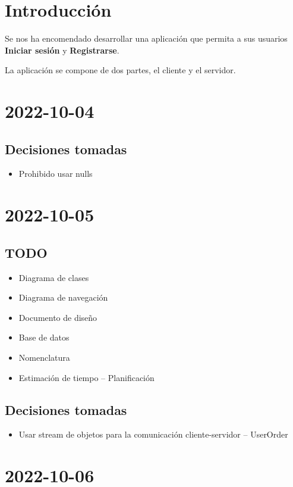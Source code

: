 \documentclass[a4paper]{article}
\begin{document}
	\newpage

	\section{Introducción}
		Se nos ha encomendado desarrollar una aplicación que permita a
		sus usuarios \textbf{Iniciar sesión} y \textbf{Registrarse}.
		
		La aplicación se compone de dos partes, el cliente y el servidor. 
		
	\section{2022-10-04}
		\subsection{Decisiones tomadas}
			\begin{itemize}
				\item Prohibido usar nulls
			\end{itemize}
	\section{2022-10-05}
		\subsection{TODO}
			\begin{itemize}
				\item Diagrama de clases
				\item Diagrama de navegación
				\item Documento de diseño
				\item Base de datos
				\item Nomenclatura
				\item Estimación de tiempo -- Planificación
			\end{itemize}
		\subsection{Decisiones tomadas}
			\begin{itemize}
				\item Usar stream de objetos para la comunicación cliente-servidor
					-- UserOrder
			\end{itemize}
	\section{2022-10-06}
\end{document}
